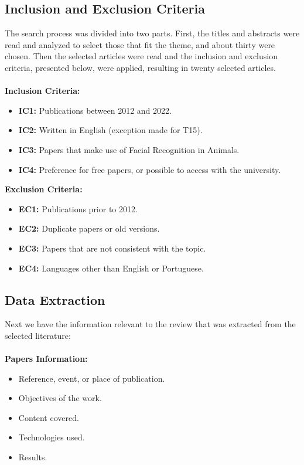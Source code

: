\documentclass[alpha-refs,english]{RBCA_v3.0}
\begin{document}
\subsection{Inclusion and Exclusion Criteria}
The search process was divided into two parts. First, the titles and abstracts were read and analyzed to select those that fit the theme, and about thirty were chosen. Then the selected articles were read and the inclusion and exclusion criteria, presented below, were applied, resulting in twenty selected articles. \\ \\
\textbf{Inclusion Criteria:}
\begin{itemize}
	\item \textbf{IC1:}  Publications between 2012 and 2022.
	\item \textbf{IC2:} Written in English (exception made for T15).
	\item \textbf{IC3:} Papers that make use of Facial Recognition in Animals.
	\item \textbf{IC4:} Preference for free papers, or possible to access with the university.
\end{itemize}
\textbf{Exclusion Criteria:}
\begin{itemize}
	\item \textbf{EC1:}  Publications prior to 2012.
	\item \textbf{EC2:} Duplicate papers or old versions.
	\item \textbf{EC3:} Papers that are not consistent with the topic.
	\item \textbf{EC4:} Languages other than English or Portuguese.
\end{itemize}

\subsection{Data Extraction}
Next we have the information relevant to the review that was extracted from the selected literature: \\ \\
\textbf{Papers Information:}
\begin{itemize}
	\item Reference, event, or place of publication.
	\item Objectives of the work.
	\item Content covered.
	\item Technologies used.
	\item Results.
\end{itemize}
\end{document}
